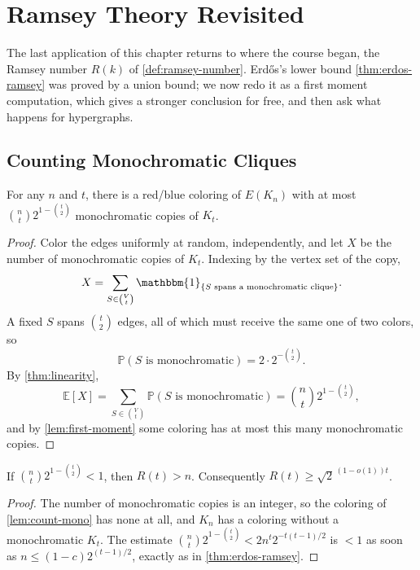 \section{Ramsey Theory Revisited}\label{sec:ramsey-counting}

The last application of this chapter returns to where the course began, the Ramsey number \(R(k)\) of \autoref{def:ramsey-number}. Erd\H{o}s's lower bound \autoref{thm:erdos-ramsey} was proved by a union bound; we now redo it as a first moment computation, which gives a stronger conclusion for free, and then ask what happens for hypergraphs.

\subsection{Counting Monochromatic Cliques}

\begin{lemma}\label{lem:count-mono}
    For any \(n\) and \(t\), there is a red/blue coloring of \(E(K_n)\) with at most \(\binom{n}{t} 2^{1 - \binom{t}{2}}\) monochromatic copies of \(K_t\).
\end{lemma}

\begin{proof}
    Color the edges uniformly at random, independently, and let \(X\) be the number of monochromatic copies of \(K_t\). Indexing by the vertex set of the copy,
    \[
        X = \sum_{S \in \binom{V}{t}} \mathbbm{1}_{\{S \text{ spans a monochromatic clique}\}}.
    \]
    A fixed \(S\) spans \(\binom{t}{2}\) edges, all of which must receive the same one of two colors, so
    \[
        \mathbb{P}(S \text{ is monochromatic}) = 2 \cdot 2^{-\binom{t}{2}}.
    \]
    By \autoref{thm:linearity},
    \[
        \mathbb{E}[X] = \sum_{S \in \binom{V}{t}} \mathbb{P}(S \text{ is monochromatic}) = \binom{n}{t} 2^{1 - \binom{t}{2}},
    \]
    and by \autoref{lem:first-moment} some coloring has at most this many monochromatic copies.
\end{proof}

\begin{corollary}\label{cor:ramsey-lower}
    If \(\binom{n}{t} 2^{1-\binom{t}{2}} < 1\), then \(R(t) > n\). Consequently \(R(t) \ge \sqrt{2}^{\,(1-o(1))t}\).
\end{corollary}

\begin{proof}
    The number of monochromatic copies is an integer, so the coloring of \autoref{lem:count-mono} has none at all, and \(K_n\) has a coloring without a monochromatic \(K_t\). The estimate \(\binom{n}{t} 2^{1-\binom{t}{2}} < 2 n^t 2^{-t(t-1)/2}\) is \(< 1\) as soon as \(n \le (1-c) 2^{(t-1)/2}\), exactly as in \autoref{thm:erdos-ramsey}.
\end{proof}

